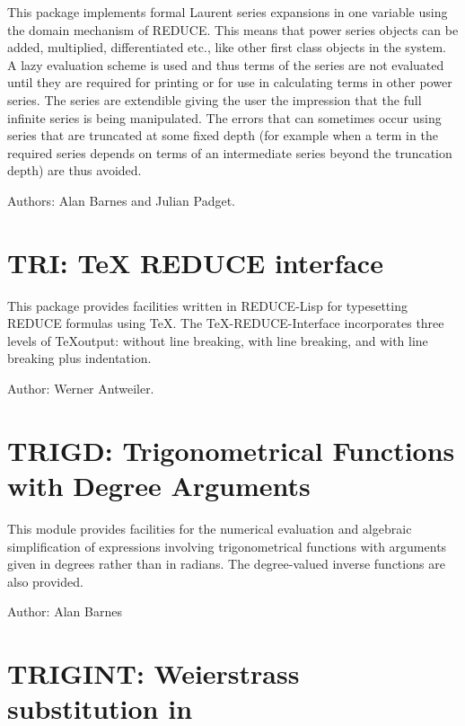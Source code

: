 This package implements formal Laurent series expansions in one variable
using the domain mechanism of REDUCE.  This means that power series
objects can be added, multiplied, differentiated etc.,  like other first
class objects in the system.  A lazy evaluation scheme is used and thus
terms of the series are not evaluated until they are required for printing
or for use in calculating terms in other power series.  The series are
extendible giving the user the impression that the full infinite series is
being manipulated.  The errors that can sometimes occur using series that
are truncated at some fixed depth (for example when a term in the required
series depends on terms of an intermediate series beyond the truncation
depth) are thus avoided.

Authors:  Alan Barnes and Julian Padget.



\newpage

\section{TRI: TeX REDUCE interface} 

This package provides facilities written in REDUCE-Lisp for typesetting
REDUCE formulas using \TeX.  The \TeX-REDUCE-Interface incorporates three
levels of \TeX output: without line breaking, with line breaking, and
with line breaking plus indentation.

Author: Werner Antweiler.

\newpage

\section{TRIGD: Trigonometrical Functions with Degree Arguments}

This module provides facilities for the numerical evaluation and
algebraic simplification of expressions involving trigonometrical
functions with arguments given in degrees rather than in radians. The
degree-valued inverse functions are also provided.

Author: Alan Barnes



\newpage

\section{TRIGINT: Weierstrass substitution in \REDUCE}

